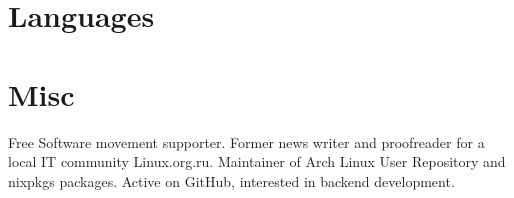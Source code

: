 \section{Languages}

\section{Misc}

Free Software movement supporter. Former news writer and proofreader for a local IT community
Linux.org.ru. Maintainer of Arch Linux User Repository and nixpkgs packages. Active on GitHub,
interested in backend development.
